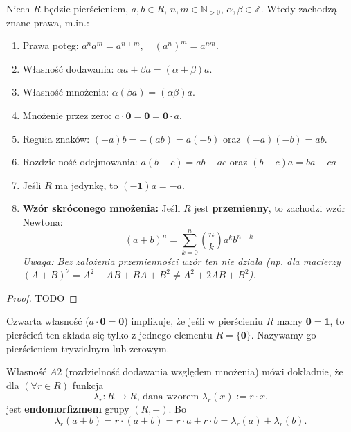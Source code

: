 \begin{fact}
    Niech $R$ będzie pierścieniem, $a,b \in R$, $n,m \in \mathbb{N}_{>0}$, $\alpha, \beta \in \mathbb{Z}$. Wtedy zachodzą znane prawa, m.in.:
    \begin{enumerate}
        \item Prawa potęg: $a^n a^m = a^{n+m}, \quad (a^n)^m = a^{nm}$.
	\item Własność dodawania: $\alpha a + \beta a = \left( \alpha +\beta  \right) a$.
	\item Własność mnożenia: $\alpha \left( \beta a \right) = \left( \alpha \beta  \right) a$. 
        \item Mnożenie przez zero: $a \cdot \mathbf{0} = \mathbf{0} = \mathbf{0} \cdot a$.
        \item Reguła znaków: $(-a)b = -(ab) = a(-b)$ oraz $(-a)(-b) = ab$.
        \item Rozdzielność odejmowania: $a(b-c) = ab - ac$ oraz $\left( b-c \right)a = ba - ca$
        \item Jeśli $R$ ma jedynkę, to $(-\mathbf{1})a = -a$.
        \item \textbf{Wzór skróconego mnożenia:} Jeśli $R$ jest \textbf{przemienny}, to zachodzi wzór Newtona:
        \[ (a+b)^n = \sum_{k=0}^n \binom{n}{k} a^k b^{n-k} \]
        \textit{Uwaga: Bez założenia przemienności wzór ten nie działa (np. dla macierzy $(A+B)^2 = A^2 + AB + BA + B^2 \neq A^2 + 2AB + B^2$).}
    \end{enumerate}
\end{fact}
\begin{proof}
	TODO
\end{proof} 

\begin{remark}
    Czwarta własność ($a \cdot \mathbf{0} = \mathbf{0}$) implikuje, że jeśli w pierścieniu $R$ mamy $\mathbf{0} = \mathbf{1}$, to pierścień ten składa się tylko z jednego elementu $R=\{\mathbf{0}\}$. Nazywamy go pierścieniem trywialnym lub zerowym.
\end{remark}
\begin{remark}
	Własność $A2$ (rozdzielność dodawania względem mnożenia) mówi dokładnie, że dla  $\left(\forall r\in R \right) $ funkcja
	\[
	\lambda_{r}: R \to R\text{, dana wzorem } \lambda_{r}\left( x \right) := r\cdot x
	.\] 
	jest \textbf{endomorfizmem} grupy $\left( R,+ \right) $. Bo
	\[
	\lambda_{r}\left( a + b \right) = r\cdot \left( a+b \right) = r\cdot a + r \cdot b = \lambda_{r}\left( a \right) + \lambda_{r}\left( b \right) 
	.\] 
\end{remark} 
